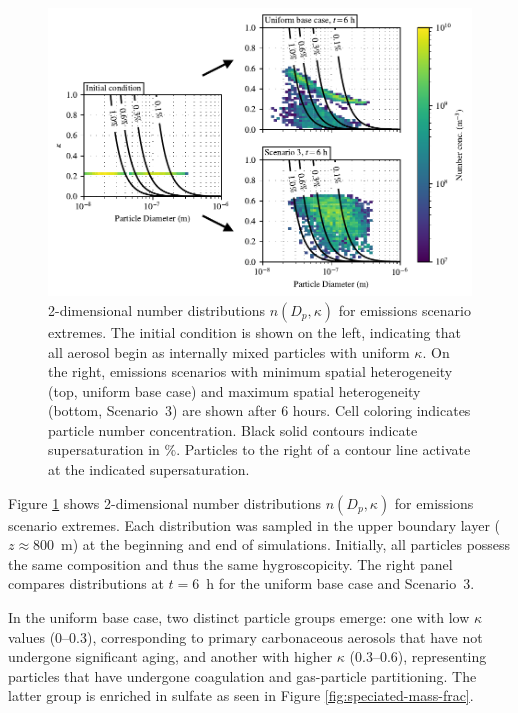 \documentclass[journal abbreviation, manuscript]{copernicus}
\begin{document}
\begin{figure}[!t]
	\centering
	\includegraphics[]{figures/2d-kappa-dist-three-panel-z40.pdf}
	\caption{2-dimensional number distributions $n(D_p, \kappa)$ for emissions scenario extremes. The initial condition is shown on the left, indicating that all aerosol begin as internally mixed particles with uniform $\kappa$. On the right, emissions scenarios with minimum spatial heterogeneity (top, uniform base case) and maximum spatial heterogeneity (bottom, Scenario~3) are shown after 6 hours. Cell coloring indicates particle number concentration. Black solid contours indicate supersaturation in $\%$. Particles to the right of a contour line activate at the indicated supersaturation.}
	\label{fig:kappa-dist}
\end{figure} 

Figure \ref{fig:kappa-dist} shows 2-dimensional number distributions
$n(D_p, \kappa)$ for emissions scenario extremes. Each distribution
was sampled in the upper boundary layer ($z\approx 800$~m) at the
beginning and end of simulations. Initially, all particles possess the
same composition and thus the same hygroscopicity.  The right panel
compares distributions at $t=6$~h for the uniform base case and
Scenario~3.

In the uniform base case, two distinct particle groups emerge: one
with low $\kappa$ values (0--0.3), corresponding to primary
carbonaceous aerosols that have not undergone significant aging, and
another with higher $\kappa$ (0.3--0.6), representing particles that
have undergone coagulation and gas-particle partitioning. The latter
group is enriched in sulfate as seen in Figure
\ref{fig:speciated-mass-frac}.
\end{document}
